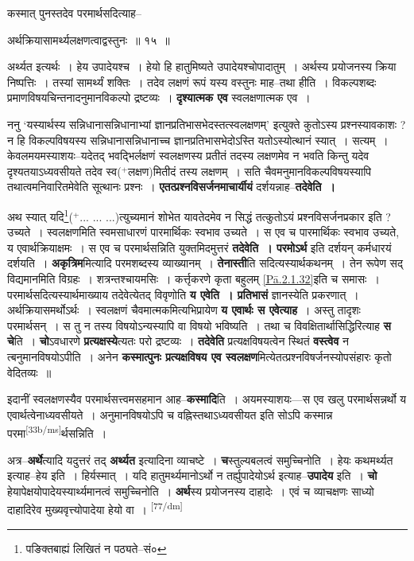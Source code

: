 \documentclass[article,12pt,a4paper]{memoir}
\newcommand{\add}[1]{($^{+}$#1)}
\begin{document}
	कस्मात् पुनस्तदेव परमार्थसदित्याह-- 
	  
	अर्थक्रियासामर्थ्यलक्षणत्वाद्वस्तुनः ॥ १५ ॥ 
	  
	अर्थ्यत इत्यर्थः । हेय उपादेयश्च । हेयो हि हातुमिष्यते उपादेयश्चोपादातुम् । अर्थस्य प्रयोजनस्य क्रिया निष्पत्तिः । तस्यां सामर्थ्यं शक्तिः । तदेव लक्षणं रूपं यस्य वस्तुनः माह--तथा हीति । विकल्पशब्दः प्रमाणविषयचिन्तनादनुमानविकल्पो द्रष्टव्यः । \textbf{दृश्यात्मक एव} स्वलक्षणात्मक एव ।
	\pend
      

	  \pstart ननु ‘यस्यार्थस्य सन्निधानासन्निधानाभ्यां ज्ञानप्रतिभासभेदस्तत्स्वलक्षणम्’ इत्युक्ते कुतोऽस्य प्रश्नस्यावकाशः ? न हि विकल्पविषयस्य सन्निधानासन्निधानाच्च ज्ञानप्रतिभासभेदोऽस्ति यतोऽस्योत्थानं स्यात् । सत्यम् । केवलमयमस्याशयः--यदेतद् भवद्भिर्लक्षणं स्वलक्षणस्य प्रतीतं तदस्य लक्षणमेव न भवति किन्तु यदेव दृश्यतयाऽध्यवसीयते तदेव स्व\add{लक्षण}मितीदं तस्य लक्षणम् । सति चैवमनुमानविकल्पविषयस्यापि तथात्वमनिवारितमेवेति सूत्थानः प्रश्नः । \textbf{एतत्प्रश्नविसर्जनमाचार्यीयं} दर्शयन्नाह--\textbf{तदेवेति ।}
	\pend
      

	  \pstart अथ स्यात् यदि\footnote{पङिक्तबाह्यं लिखितं न पठ्यते--सं०}\add{... ... ...}त्युच्यमानं शोभेत यावतेदमेव न सिद्धं तत्कुतोऽयं प्रश्नविसर्जनप्रकार इति ? उच्यते । स्वलक्षणमिति स्वमसाधारणं पारमार्थिकः स्वभाव उच्यते । स एव च पारमार्थिकः स्वभाव उच्यते, य एवार्थक्रियाक्षमः । स एव च परमार्थसन्निति युक्तमिदमुत्तरं \textbf{तदेवेति । परमोऽर्थ} इति दर्शयन् कर्मधारयं दर्शयति । \textbf{अकृत्रिम}मित्यादि परमशब्दस्य व्याख्यानम् । \textbf{तेनास्ती}ति सदित्यस्यार्थकथनम् । तेन रूपेण सद् विद्यमानमिति विग्रहः । शत्रन्तश्चायमसिः । कर्त्तृकरणे कृता बहुलम् \cref{Pā.2.1.32}इति च समासः । परमार्थसदित्यस्यार्थमाख्याय तदेवेत्येतद् विवृणोति \textbf{य एवेति । प्रतिभासं} ज्ञानस्येति प्रकरणात् । अर्थक्रियासमर्थोऽर्थः । स्वलक्षणं चैवमात्मकमित्यभिप्रायेण \textbf{य एवार्थः स एवेत्याह} । अस्तु तादृशः परमार्थसन् । स तु न तस्य विषयोऽन्यस्यापि वा विषयो भविष्यति । तथा च विवक्षितार्थासिद्धिरित्याह \textbf{स चे}ति । \textbf{चो}ऽवधारणे \textbf{प्रत्यक्षस्ये}त्यतः परो द्रष्टव्यः । \textbf{तदेवेति} प्रत्यक्षविषयत्वेन स्थितं \textbf{वस्त्वेव} न त्बनुमानविषयोऽपीति । अनेन \textbf{कस्मात्पुनः प्रत्यक्षविषय एव स्वलक्षण}मित्येतत्प्रश्नविषर्जनस्योपसंहारः कृतो वेदितव्यः ॥
	\pend
      

	  \pstart इदानीं स्वलक्षणस्यैव परमार्थसत्त्वमसहमान आह--\textbf{कस्मादि}ति । अयमस्याशयः—स एव खलु परमार्थसन्नर्थो य एवार्थत्वेनाध्यवसीयते । अनुमानविषयोऽपि च वह्निस्तथाऽध्यवसीयत इति सोऽपि कस्मान्न परमा\leavevmode\textsuperscript{\rmlatinfont\tiny [33b/ms]}र्थसन्निति ।
	\pend
      

	  \pstart अत्र--\textbf{अर्थे}त्यादि यदुत्तरं तद् \textbf{अर्थ्यत} इत्यादिना व्याचष्टे । \textbf{च}स्तुल्यबलत्वं समुच्चिनोति । हेयः कथमर्थ्यत इत्याह--हेय इति । हिर्यस्मात् । यदि हातुमर्थ्यमानोऽर्थो न तर्ह्युपादेयोऽर्थ इत्याह--\textbf{उपादेय} इति । \textbf{चो} हेयापेक्षयोपादेयस्यार्थ्यमानत्वं समुच्चिनोति । \textbf{अर्थ}स्य प्रयोजनस्य दाहादेः । एवं च व्याचक्षणः साध्यो दाहादिरेव मुख्यवृत्त्योपादेया हेयो वा । \leavevmode\textsuperscript{\rmlatinfont\tiny [77/dm]} 
	  
\end{document}
